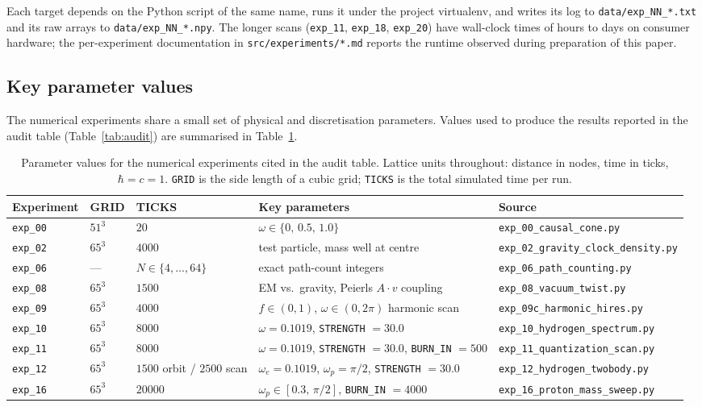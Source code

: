 Each target depends on the Python script of the same name, runs it
under the project virtualenv, and writes its log to
\texttt{data/exp\_NN\_*.txt} and its raw arrays to
\texttt{data/exp\_NN\_*.npy}. The longer scans
(\texttt{exp\_11}, \texttt{exp\_18}, \texttt{exp\_20}) have wall-clock
times of hours to days on consumer hardware; the per-experiment
documentation in \texttt{src/experiments/*.md} reports the runtime
observed during preparation of this paper.

\subsection*{Key parameter values}

The numerical experiments share a small set of physical and
discretisation parameters. Values used to produce the results
reported in the audit table (Table~\ref{tab:audit}) are summarised
in Table~\ref{tab:experiment_parameters}.

\begin{table}[htbp]
\centering
\footnotesize
\setlength{\tabcolsep}{4pt}
\caption{\small Parameter values for the numerical experiments cited
in the audit table. Lattice units throughout: distance in nodes,
time in ticks, $\hbar = c = 1$. \texttt{GRID} is the side length of
a cubic grid; \texttt{TICKS} is the total simulated time per run.}
\label{tab:experiment_parameters}
\begin{tabular}{@{}p{2.0cm}p{1.0cm}p{2.1cm}p{4.4cm}p{4.3cm}@{}}
\hline
\textbf{Experiment} & \textbf{GRID} & \textbf{TICKS} &
\textbf{Key parameters} & \textbf{Source} \\
\hline
\texttt{exp\_00} & $51^3$ & $20$ &
$\omega \in \{0,\, 0.5,\, 1.0\}$ &
\nolinkurl{exp_00_causal_cone.py} \\
\texttt{exp\_02} & $65^3$ & $4000$ &
test particle, mass well at centre &
\nolinkurl{exp_02_gravity_clock_density.py} \\
\texttt{exp\_06} & --- & $N \in \{4,\dots,64\}$ &
exact path-count integers &
\nolinkurl{exp_06_path_counting.py} \\
\texttt{exp\_08} & $65^3$ & $1500$ &
EM vs.\ gravity, Peierls $A\!\cdot\!v$ coupling &
\nolinkurl{exp_08_vacuum_twist.py} \\
\texttt{exp\_09} & $65^3$ & $4000$ &
$f\!\in\!(0,1)$, $\omega\!\in\!(0,2\pi)$ harmonic scan &
\nolinkurl{exp_09c_harmonic_hires.py} \\
\texttt{exp\_10} & $65^3$ & $8000$ &
$\omega = 0.1019$, \texttt{STRENGTH} $= 30.0$ &
\nolinkurl{exp_10_hydrogen_spectrum.py} \\
\texttt{exp\_11} & $65^3$ & $8000$ &
$\omega = 0.1019$, \texttt{STRENGTH} $= 30.0$,
\texttt{BURN\_IN} $= 500$ &
\nolinkurl{exp_11_quantization_scan.py} \\
\texttt{exp\_12} & $65^3$ &
$1500$ orbit / $2500$ scan &
$\omega_e = 0.1019$, $\omega_p = \pi/2$,
\texttt{STRENGTH} $= 30.0$ &
\nolinkurl{exp_12_hydrogen_twobody.py} \\
\texttt{exp\_16} & $65^3$ & $20000$ &
$\omega_p \in [0.3,\, \pi/2]$, \texttt{BURN\_IN} $= 4000$ &
\nolinkurl{exp_16_proton_mass_sweep.py} \\
\hline
\end{tabular}
\end{table}

